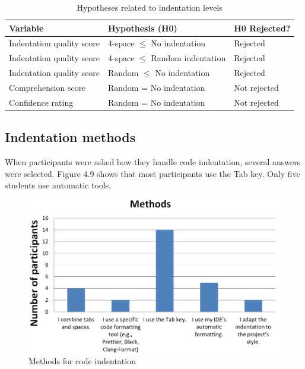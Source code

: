 \begin{table}[ht]
\centering
\small
\begin{tabular}{|p{5cm}|p{6cm}|p{2.5cm}|}
\hline
\rule{0pt}{1.2em}\textbf{Variable} & \textbf{Hypothesis (H0)} & \textbf{H0 Rejected?} \\[0.5em]
\hline
\rule{0pt}{1.2em}Indentation quality score & 4-space $\leq$ No indentation & Rejected \\[0.5em]
\hline
\rule{0pt}{1.2em}Indentation quality score & 4-space $\leq$ Random indentation & Rejected \\[0.5em]
\hline
\rule{0pt}{1.2em}Indentation quality score & Random $\leq$ No indentation & Rejected \\[0.5em]
\hline
\rule{0pt}{1.2em}Comprehension score & Random = No indentation & Not rejected \\[0.5em]
\hline
\rule{0pt}{1.2em}Confidence rating & Random = No indentation & Not rejected \\[0.5em]
\hline
\end{tabular}
\caption{Hypotheses related to indentation levels}
\end{table}


\subsection{Indentation methods}
When participants were asked how they handle code indentation, several answers were selected. Figure 4.9 shows that most participants use the Tab key. Only five students use automatic tools.  

\begin{figure} [H]
  \centering
  \includegraphics[scale=0.8]{figures/inM.png}
  \caption{Methods for code indentation}
  \label{fig:AnhangsChor}
\end{figure}



